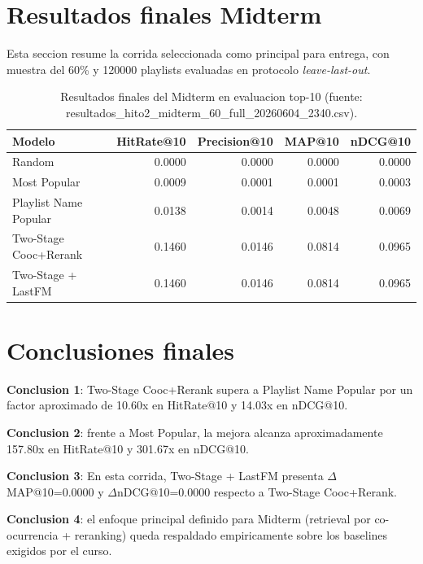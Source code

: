 
\section{Resultados finales Midterm}

Esta seccion resume la corrida seleccionada como principal para entrega, con muestra del 60\% y 120000 playlists evaluadas en protocolo \textit{leave-last-out}.

\begin{table}[H]
\centering
\small
\begin{tabular}{lrrrr}
\toprule
\textbf{Modelo} & \textbf{HitRate@10} & \textbf{Precision@10} & \textbf{MAP@10} & \textbf{nDCG@10}\\
\midrule
Random & 0.0000 & 0.0000 & 0.0000 & 0.0000\\
Most Popular & 0.0009 & 0.0001 & 0.0001 & 0.0003\\
Playlist Name Popular & 0.0138 & 0.0014 & 0.0048 & 0.0069\\
Two-Stage Cooc+Rerank & 0.1460 & 0.0146 & 0.0814 & 0.0965\\
Two-Stage + LastFM & 0.1460 & 0.0146 & 0.0814 & 0.0965\\
\bottomrule
\end{tabular}
\caption{Resultados finales del Midterm en evaluacion top-10 (fuente: resultados_hito2_midterm_60_full_20260604_2340.csv).}
\label{tab:midterm_results_final}
\end{table}

\section{Conclusiones finales}

\textbf{Conclusion 1}: Two-Stage Cooc+Rerank supera a Playlist Name Popular por un factor aproximado de 10.60x en HitRate@10 y 14.03x en nDCG@10.

\textbf{Conclusion 2}: frente a Most Popular, la mejora alcanza aproximadamente 157.80x en HitRate@10 y 301.67x en nDCG@10.

\textbf{Conclusion 3}: En esta corrida, Two-Stage + LastFM presenta $\Delta$MAP@10=0.0000 y $\Delta$nDCG@10=0.0000 respecto a Two-Stage Cooc+Rerank.

\textbf{Conclusion 4}: el enfoque principal definido para Midterm (retrieval por co-ocurrencia + reranking) queda respaldado empiricamente sobre los baselines exigidos por el curso.
